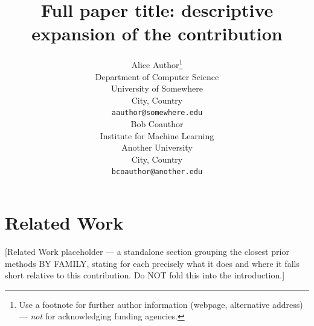 \documentclass{article}
\title{Full paper title: descriptive expansion of the contribution}
\author{%
  Alice Author\thanks{Use a footnote for further author information (webpage, alternative address) ---
    \emph{not} for acknowledging funding agencies.} \\
  Department of Computer Science\\
  University of Somewhere\\
  City, Country \\
  \texttt{aauthor@somewhere.edu} \\
  \And
  Bob Coauthor \\
  Institute for Machine Learning\\
  Another University\\
  City, Country \\
  \texttt{bcoauthor@another.edu} \\
}
\begin{document}
\maketitle







\section{Related Work}
\label{sec:related}
[Related Work placeholder — a standalone section grouping the closest prior methods BY FAMILY, stating
for each precisely what it does and where it falls short relative to this contribution. Do NOT fold this
into the introduction.]






\appendix

\end{document}
